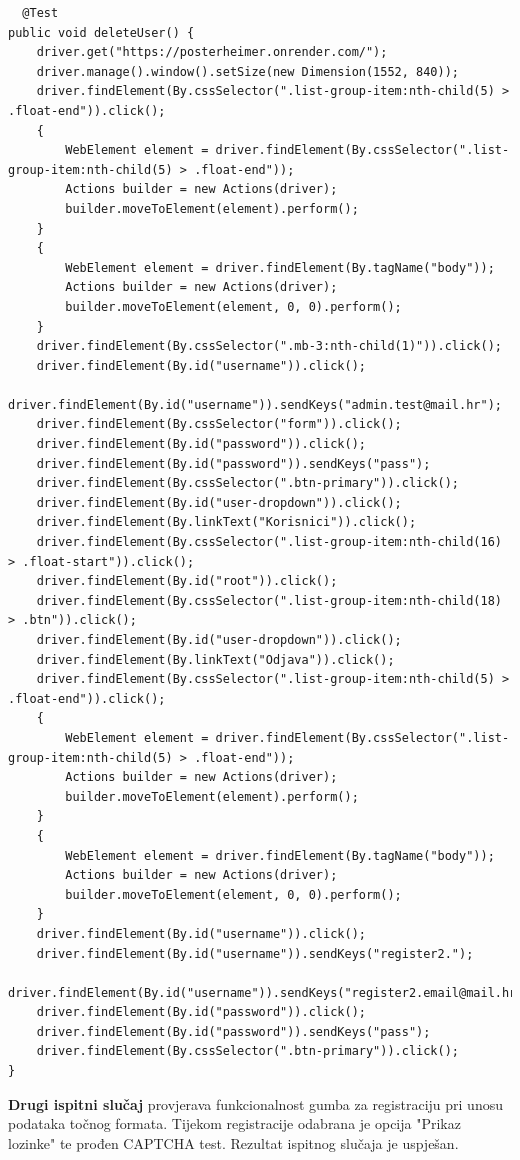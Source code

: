 		\begin{lstlisting}
  @Test
public void deleteUser() {
	driver.get("https://posterheimer.onrender.com/");
	driver.manage().window().setSize(new Dimension(1552, 840));
	driver.findElement(By.cssSelector(".list-group-item:nth-child(5) > .float-end")).click();
	{
		WebElement element = driver.findElement(By.cssSelector(".list-group-item:nth-child(5) > .float-end"));
		Actions builder = new Actions(driver);
		builder.moveToElement(element).perform();
	}
	{
		WebElement element = driver.findElement(By.tagName("body"));
		Actions builder = new Actions(driver);
		builder.moveToElement(element, 0, 0).perform();
	}
	driver.findElement(By.cssSelector(".mb-3:nth-child(1)")).click();
	driver.findElement(By.id("username")).click();
	driver.findElement(By.id("username")).sendKeys("admin.test@mail.hr");
	driver.findElement(By.cssSelector("form")).click();
	driver.findElement(By.id("password")).click();
	driver.findElement(By.id("password")).sendKeys("pass");
	driver.findElement(By.cssSelector(".btn-primary")).click();
	driver.findElement(By.id("user-dropdown")).click();
	driver.findElement(By.linkText("Korisnici")).click();
	driver.findElement(By.cssSelector(".list-group-item:nth-child(16) > .float-start")).click();
	driver.findElement(By.id("root")).click();
	driver.findElement(By.cssSelector(".list-group-item:nth-child(18) > .btn")).click();
	driver.findElement(By.id("user-dropdown")).click();
	driver.findElement(By.linkText("Odjava")).click();
	driver.findElement(By.cssSelector(".list-group-item:nth-child(5) > .float-end")).click();
	{
		WebElement element = driver.findElement(By.cssSelector(".list-group-item:nth-child(5) > .float-end"));
		Actions builder = new Actions(driver);
		builder.moveToElement(element).perform();
	}
	{
		WebElement element = driver.findElement(By.tagName("body"));
		Actions builder = new Actions(driver);
		builder.moveToElement(element, 0, 0).perform();
	}
	driver.findElement(By.id("username")).click();
	driver.findElement(By.id("username")).sendKeys("register2.");
	driver.findElement(By.id("username")).sendKeys("register2.email@mail.hr");
	driver.findElement(By.id("password")).click();
	driver.findElement(By.id("password")).sendKeys("pass");
	driver.findElement(By.cssSelector(".btn-primary")).click();
}
		\end{lstlisting}
		
\textbf{Drugi ispitni slučaj} provjerava funkcionalnost gumba za registraciju pri unosu podataka točnog formata. Tijekom registracije odabrana je opcija "Prikaz lozinke" te prođen CAPTCHA test. Rezultat ispitnog slučaja je uspješan.


